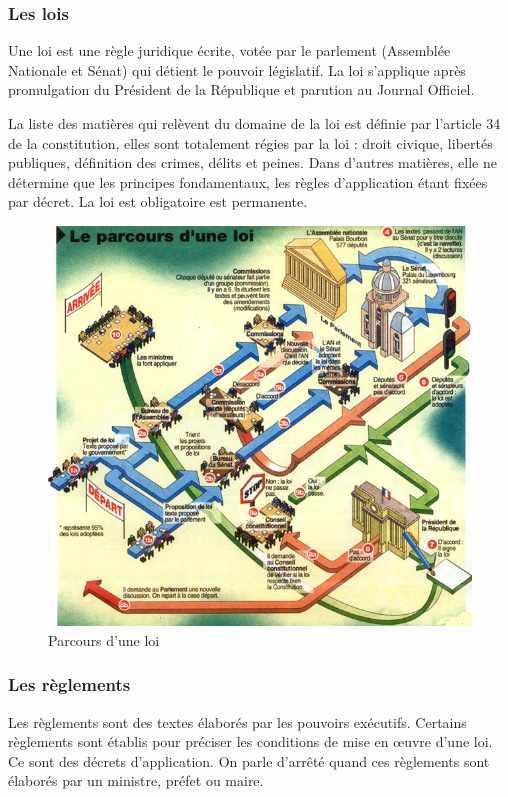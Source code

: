 \documentclass[11pt]{article}
\begin{document}
			\subsubsection{Les lois}
				Une loi est une règle juridique écrite, votée par le parlement (Assemblée Nationale et Sénat) qui détient le pouvoir législatif. La loi s'applique après promulgation du Président de la République et parution au Journal Officiel.
				
				La liste des matières qui relèvent du domaine de la loi est définie par l'article 34 de la constitution, elles sont totalement régies par la loi : droit civique, libertés publiques, définition des crimes, délits et peines. Dans d'autres matières, elle ne détermine que les principes fondamentaux, les règles d'application étant fixées par décret. La loi est obligatoire est permanente.

				\begin{figure}[h!]
					\begin{center}
						\includegraphics[scale=0.7]{images/ParcoursLoi.png}
						\caption{Parcours d'une loi}
					\end{center}
				\end{figure}
				
			\subsubsection{Les règlements}
				Les règlements sont des textes élaborés par les pouvoirs exécutifs. Certains règlements sont établis pour préciser les conditions de mise en œuvre d'une loi. Ce sont des décrets d'application. On parle d'arrêté quand ces règlements sont élaborés par un ministre, préfet ou maire.
				
\end{document}
